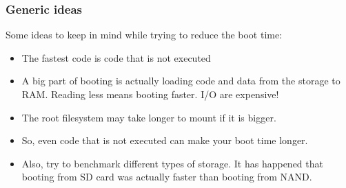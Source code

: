 \begin{frame}
\frametitle{Generic ideas}
Some ideas to keep in mind while trying to reduce the boot time:
\begin{itemize}
\item The fastest code is code that is not executed
\item A big part of booting is actually loading code and data from the
      storage to RAM. Reading less means booting faster. I/O are
      expensive!
\item The root filesystem may take longer to mount if it is bigger.
\item So, even code that is not executed can make your boot time
      longer.
\item Also, try to benchmark different types of storage. It has
      happened that booting from SD card was actually faster than
      booting from NAND.
\end{itemize}
\end{frame}
